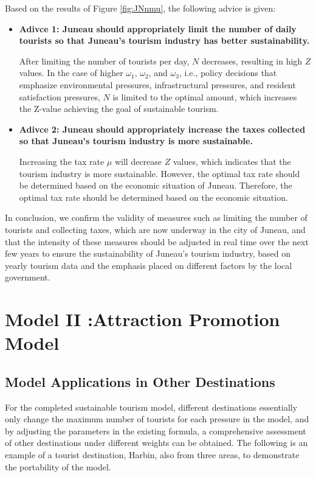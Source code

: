 \documentclass{mcmthesis}
\begin{document}
{Based on the results of Figure \ref{fig:JNnmu}, the following advice is given:}
\begin{itemize}
  \item \textbf{Adivce 1: Juneau should appropriately limit the number of daily tourists so that Juneau's tourism industry has better sustainability.}
  
  {After limiting the number of tourists per day, $N$ decreases, resulting in high $Z$ values. In the case of higher $\omega_1$, $\omega_2$, and $\omega_3$, i.e., policy decisions that emphasize environmental pressures, infrastructural pressures, and resident satisfaction pressures, $N$ is limited to the optimal amount, which increases the Z-value achieving the goal of sustainable tourism.}
  \item \textbf{Adivce 2: Juneau should appropriately increase the taxes collected so that Juneau's tourism industry is more sustainable.}
  
  {Increasing the tax rate $\mu$ will decrease $Z$ values, which indicates that the tourism industry is more sustainable. However, the optimal tax rate should be determined based on the economic situation of Juneau. Therefore, the optimal tax rate should be determined based on the economic situation.}
\end{itemize}
{In conclusion, we confirm the validity of measures such as limiting the number of tourists and collecting taxes, which are now underway in the city of Juneau, and that the intensity of these measures should be adjusted in real time over the next few years to ensure the sustainability of Juneau's tourism industry, based on yearly tourism data and the emphasis placed on different factors by the local government.}
\section{Model II :Attraction Promotion Model}
\subsection{Model Applications in Other Destinations}
{For the completed sustainable tourism model, different destinations essentially only change the maximum number of tourists for each pressure in the model, and by adjusting the parameters in the existing formula, a comprehensive assessment of other destinations under different weights can be obtained. The following is an example of a tourist destination, Harbin, also from three areas, to demonstrate the portability of the model.}
\end{document}
